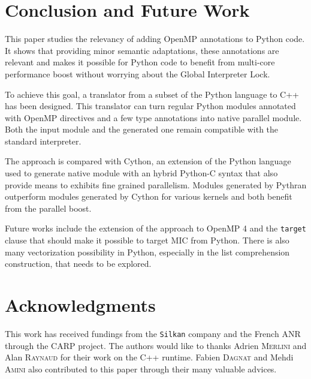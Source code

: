 \documentclass{llncs}
\begin{document}
\section{Conclusion and Future Work}

This paper studies the relevancy of adding OpenMP annotations to Python code. It
shows that providing minor semantic adaptations, these annotations are relevant
and makes it possible for Python code to benefit from multi-core performance
boost without worrying about the Global Interpreter Lock.

To achieve this goal, a translator from a subset of the Python language to C++
has been designed. This translator can turn regular Python modules
annotated with OpenMP directives and a few type annotations into native parallel
module. Both the input module and the generated one remain compatible with the
standard interpreter.

The approach is compared with Cython, an extension of the Python language used
to generate native module with an hybrid Python-C syntax that also provide means
to exhibits fine grained parallelism. Modules generated by Pythran outperform
modules generated by Cython for various kernels and both benefit from the
parallel boost.

Future works include the extension of the approach to OpenMP 4 and the
\texttt{target} clause that should make it possible to target MIC from Python.
There is also many vectorization possibility in Python, especially in the list
comprehension construction, that needs to be explored.

\section*{Acknowledgments}

This work has received fundings from the \texttt{Silkan} company and the French
ANR through the CARP project. The authors would like to thanks Adrien
\textsc{Merlini} and Alan \textsc{Raynaud} for their work on the C++ runtime.
Fabien \textsc{Dagnat} and Mehdi \textsc{Amini} also contributed to this paper
through their many valuable advices.



\end{document}
